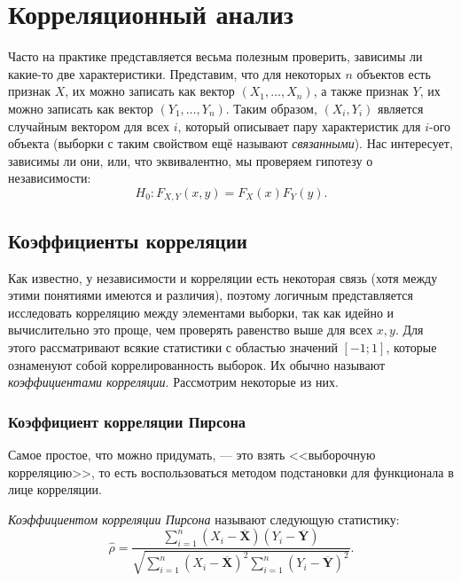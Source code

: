\section{Корреляционный анализ}

Часто на практике представляется весьма полезным проверить, зависимы ли какие-то две характеристики. Представим, что для некоторых $n$ объектов есть признак $X$, их можно записать как вектор $(X_1, \ldots, X_n)$, а также признак $Y$, их можно записать как вектор $(Y_1, \ldots, Y_n)$. Таким образом, $(X_i, Y_i)$ является случайным вектором для всех $i$, который описывает пару характеристик для $i$-ого объекта (выборки с таким свойством ещё называют \textit{связанными}). Нас интересует, зависимы ли они, или, что эквивалентно, мы проверяем гипотезу о независимости:
\[
H_0\colon F_{X, Y}(x, y) = F_X(x)F_Y(y).
\]

\subsection{Коэффициенты корреляции}

Как известно, у независимости и корреляции есть некоторая связь (хотя между этими понятиями имеются и различия), поэтому логичным представляется исследовать корреляцию между элементами выборки, так как идейно и вычислительно это проще, чем проверять равенство выше для всех $x, y$. Для этого рассматривают всякие статистики с областью значений $[-1; 1]$, которые ознаменуют собой коррелированность выборок. Их обычно называют \textit{коэффициентами корреляции}. Рассмотрим некоторые из них.

\subsubsection{Коэффициент корреляции Пирсона}

Самое простое, что можно придумать, --- это взять <<выборочную корреляцию>>, то есть воспользоваться методом подстановки для функционала в лице корреляции.

\begin{definition}
    \textit{Коэффициентом корреляции Пирсона} называют следующую статистику:
    \[
    \widehat{\rho} = \frac{\sum_{i=1}^n (X_i - \overline{\mathbf X})(Y_i - \overline{\mathbf Y})}{\sqrt{\sum_{i=1}^n (X_i - \overline{\mathbf X})^2 \sum_{i=1}^n (Y_i - \overline{\mathbf Y})^2}}.
    \]
\end{definition}

